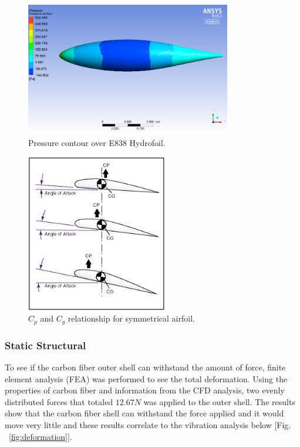 \begin{figure}[H]
  \centering
  \includegraphics[width=0.8\textwidth]{Aeroshell/Pressure_contour.png}
  \caption{\label{fig:pressurecontour}Pressure contour over E838 Hydrofoil.}
\end{figure}

\begin{figure}[H]
	\centering
    \includegraphics[width=0.55\textwidth]{Aeroshell/CP_angle_of_attack.png}
    \caption{\label{fig:cpcg}$C_p$ and $C_g$ relationship for symmetrical airfoil.}
\end{figure}

\subsubsection*{Static Structural}
\indent\indent To see if the carbon fiber outer shell can withstand the amount of force, finite element analysis (FEA) was performed to see the total deformation. Using the properties of carbon fiber and information from the CFD analysis, two evenly distributed forces that totaled $12.67 N$ was applied to the outer shell. The results show that the carbon fiber shell can withstand the force applied and it would move very little and these results correlate to the vibration analysis below [Fig. ~\ref{fig:deformation}].


